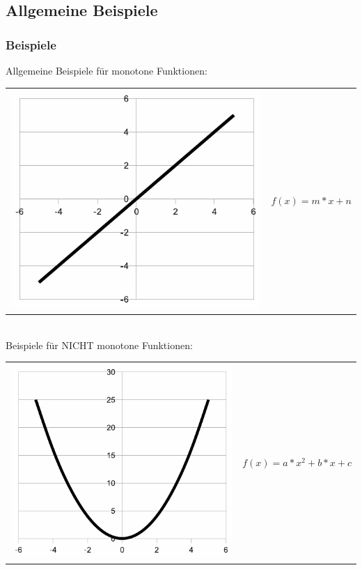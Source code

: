 \documentclass[hyperref={pdfpagelabels=false}]{beamer} %
\begin{document}
  \subsection*{Allgemeine Beispiele}
  \begin{frame}
    \frametitle{Beispiele}
    Allgemeine Beispiele für monotone Funktionen:\\
    \begin{tabular}[t]{ll}
      \includegraphics[scale=0.35]{images/f1.pdf} & $f(x) = m * x + n$
    \end{tabular}
    \\Beispiele für NICHT monotone Funktionen:\\
    \begin{tabular}[t]{ll}
      \includegraphics[scale=0.35]{images/f2.pdf} & $f(x) = a * x^2 + b * x + c$
    \end{tabular}
  \end{frame}
\end{document}

